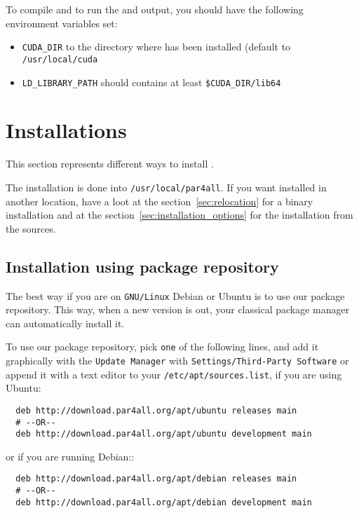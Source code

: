 \documentclass[a4paper]{article}
\begin{document}
To compile and to run the \Acuda and \Aopencl output, you should have the following
environment variables set:
\begin{itemize}
\item \verb|CUDA_DIR| to the directory where \Acuda has been installed (default to
  \texttt{/usr/local/cuda}
\item \verb|LD_LIBRARY_PATH| should contains at least \verb|$CUDA_DIR/lib64|
\end{itemize}


\section{Installations}
\label{sec:installation}

This section represents different ways to install \Apfa.

The installation is done into \texttt{/usr/local/par4all}. If you want
\Apfa installed in another location, have a loot at the
section~\ref{sec:relocation} for a binary installation and at the
section~\ref{sec:installation_options} for the installation from the
sources.


\subsection{Installation using \protect\Apfa package repository}

The best way if you are on \texttt{GNU/Linux} Debian or Ubuntu is to use
our package repository. This way, when a new version is out, your
classical package manager can automatically install it.

To use our package repository, pick \texttt{one} of the following lines, and
add it graphically with the \texttt{Update Manager} with
\texttt{Settings/Third-Party Software} or append it with a text editor to
your \texttt{/etc/apt/sources.list}, if you are using Ubuntu:

\begin{verbatim}
  deb http://download.par4all.org/apt/ubuntu releases main
  # --OR--
  deb http://download.par4all.org/apt/ubuntu development main
\end{verbatim}

or if you are running Debian::
\begin{verbatim}
  deb http://download.par4all.org/apt/debian releases main
  # --OR--
  deb http://download.par4all.org/apt/debian development main
\end{verbatim}
\end{document}
